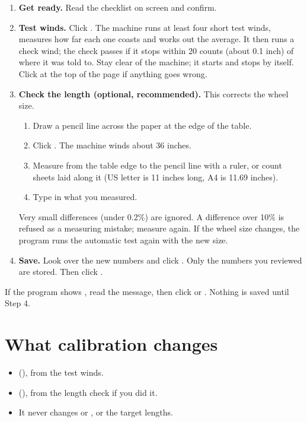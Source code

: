 \begin{enumerate}[label=\textbf{Step \arabic*},leftmargin=4.5em,itemsep=0.7em]
  \item \textbf{Get ready.} Read the checklist on screen and confirm.
  \item \textbf{Test winds.} Click . The machine
        runs at least four short test winds, measures how far each one
        coasts and works out the average. It then runs a check wind; the
        check passes if it stops within 20 counts (about 0.1 inch) of where
        it was told to. Stay clear of the machine; it starts and stops by
        itself. Click  at the top of the page if anything goes
        wrong.
  \item \textbf{Check the length (optional, recommended).} This corrects the
        wheel size.
        \begin{enumerate}[label=\alph*.]
          \item Draw a pencil line across the paper at the edge of the table.
          \item Click . The machine winds about 36 inches.
          \item Measure from the table edge to the pencil line with a ruler, or count
                sheets laid along it (US letter is 11 inches long, A4 is
                11.69 inches).
          \item Type in what you measured.
        \end{enumerate}
        Very small differences (under 0.2\%) are ignored. A difference over
        10\% is refused as a measuring mistake; measure again. If the wheel
        size changes, the program runs the automatic test again with the new
        size.
  \item \textbf{Save.} Look over the new numbers and click
        . Only the numbers you reviewed are stored.
        Then click .
\end{enumerate}

If the program shows , read the message, then click
 or . Nothing is saved until Step 4.

\section{What calibration changes}
\begin{itemize}
  \item {} (), from the test winds.
  \item {} (), from the length check
        if you did it.
  \item It never changes  or , or the
        target lengths.
\end{itemize}

